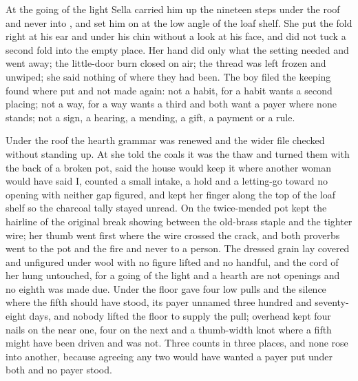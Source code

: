 \scenebreak

At the going of the light Sella carried him up the nineteen steps under the roof and never into , and set him on  at the low angle of the loaf shelf. She put the fold right at his ear and under his chin without a look at his face, and did not tuck a second fold into the empty place. Her hand did only what the setting needed and went away; the little-door burn closed on air; the thread was left frozen and unwiped; she said nothing of where they had been. The boy filed the keeping found where put and not made again: not a habit, for a habit wants a second placing; not a way, for a way wants a third and both want a payer where none stands; not a sign, a hearing, a mending, a gift, a payment or a rule.

Under the roof the hearth grammar was renewed and the wider file checked without standing up. At  she told the coals it was the thaw and turned them with the back of a broken pot, said the house would keep it where another woman would have said I, counted a small intake, a hold and a letting-go toward no opening with neither gap figured, and kept her finger along the top of the loaf shelf so the charcoal tally stayed unread. On  the twice-mended pot kept the hairline of the original break showing between the old-brass staple and the tighter wire; her thumb went first where the wire crossed the crack, and both proverbs went to the pot and the fire and never to a person. The dressed grain lay covered and unfigured under wool with no figure lifted and no handful, and the cord of her  hung untouched, for a going of the light and a hearth are not openings and no eighth was made due. Under the floor  gave four low pulls and the silence where the fifth should have stood, its payer unnamed three hundred and seventy-eight days, and nobody lifted the floor to supply the pull; overhead  kept four nails on the near one, four on the next and a thumb-width knot where a fifth might have been driven and was not. Three counts in three places, and none rose into another, because agreeing any two would have wanted a payer put under both and no payer stood.

